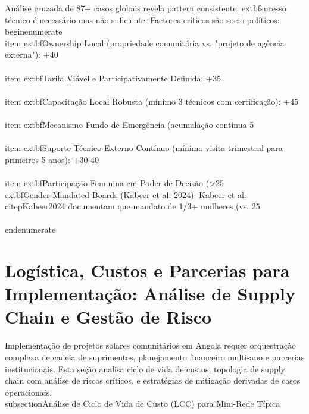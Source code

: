 \documentclass[12pt, a4paper]{article}
\begin{document}
{Análise cruzada de 87+ casos globais revela pattern consistente: 	extbf{sucesso técnico é necessário mas não suficiente}. Factores críticos são socio-políticos:\n\n\\begin{enumerate}
\\item 	extbf{Ownership Local} (propriedade comunitária vs. "projeto de agência externa"): +40\\%
\\item 	extbf{Tarifa Viável e Participativamente Definida}: +35\\%
\\item 	extbf{Capacitação Local Robusta} (mínimo 3 técnicos com certificação): +45\\%
\\item 	extbf{Mecanismo Fundo de Emergência} (acumulação contínua 5\\%
\\item 	extbf{Suporte Técnico Externo Contínuo} (mínimo visita trimestral para primeiros 5 anos): +30-40\\%
\\item 	extbf{Participação Feminina em Poder de Decisão} (>25\\%

	extbf{Gender-Mandated Boards (Kabeer et al. 2024)}: Kabeer et al.~\\citep{Kabeer2024} documentam que mandato de 1/3+ mulheres (vs. 25\\%
\\end{enumerate}\n
\section{Logística, Custos e Parcerias para Implementação: Análise de Supply Chain e Gestão de Risco}

Implementação de projetos solares comunitários em Angola requer orquestração complexa de cadeia de suprimentos, planejamento financeiro multi-ano e parcerias institucionais. Esta seção analisa ciclo de vida de custos, topologia de supply chain com análise de riscos críticos, e estratégias de mitigação derivadas de casos operacionais.\n\n\\subsection{Análise de Ciclo de Vida de Custo (LCC) para Mini-Rede Típica}

}
\end{document}

